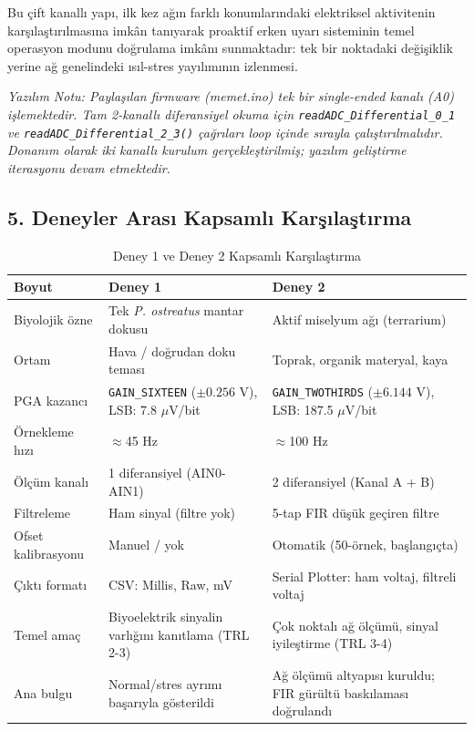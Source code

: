 \documentclass[11pt,a4paper]{article}
\begin{document}
Bu çift kanallı yapı, ilk kez ağın farklı konumlarındaki elektriksel aktivitenin karşılaştırılmasına imkân tanıyarak proaktif erken uyarı sisteminin temel operasyon modunu doğrulama imkânı sunmaktadır: tek bir noktadaki değişiklik yerine ağ genelindeki ısıl-stres yayılımının izlenmesi.

\textit{Yazılım Notu: Paylaşılan firmware (memet.ino) tek bir single-ended kanalı (A0) işlemektedir. Tam 2-kanallı diferansiyel okuma için \texttt{readADC\_Differential\_0\_1} ve \texttt{readADC\_Differential\_2\_3()} çağrıları loop içinde sırayla çalıştırılmalıdır. Donanım olarak iki kanallı kurulum gerçekleştirilmiş; yazılım geliştirme iterasyonu devam etmektedir.}

\subsection*{5. Deneyler Arası Kapsamlı Karşılaştırma}

\begin{table}[h]
\centering
\caption{Deney 1 ve Deney 2 Kapsamlı Karşılaştırma}
\begin{tabular}{p{2.8cm}p{5cm}p{5cm}}
\toprule
\textbf{Boyut} & \textbf{Deney 1} & \textbf{Deney 2}\\
\midrule
Biyolojik özne & Tek \textit{P. ostreatus} mantar dokusu & Aktif miselyum ağı (terrarium)\\
Ortam & Hava / doğrudan doku teması & Toprak, organik materyal, kaya\\
PGA kazancı & \texttt{GAIN\_SIXTEEN} ($\pm0.256$ V), LSB: 7.8 $\mu$V/bit & \texttt{GAIN\_TWOTHIRDS} ($\pm6.144$ V), LSB: 187.5 $\mu$V/bit\\
Örnekleme hızı & $\approx$45 Hz & $\approx$100 Hz\\
Ölçüm kanalı & 1 diferansiyel (AIN0-AIN1) & 2 diferansiyel (Kanal A + B)\\
Filtreleme & Ham sinyal (filtre yok) & 5-tap FIR düşük geçiren filtre\\
Ofset kalibrasyonu & Manuel / yok & Otomatik (50-örnek, başlangıçta)\\
Çıktı formatı & CSV: Millis, Raw, mV & Serial Plotter: ham voltaj, filtreli voltaj\\
Temel amaç & Biyoelektrik sinyalin varlığını kanıtlama (TRL 2-3) & Çok noktalı ağ ölçümü, sinyal iyileştirme (TRL 3-4)\\
Ana bulgu & Normal/stres ayrımı başarıyla gösterildi & Ağ ölçümü altyapısı kuruldu; FIR gürültü baskılaması doğrulandı\\
\bottomrule
\end{tabular}
\end{table}
\end{document}

